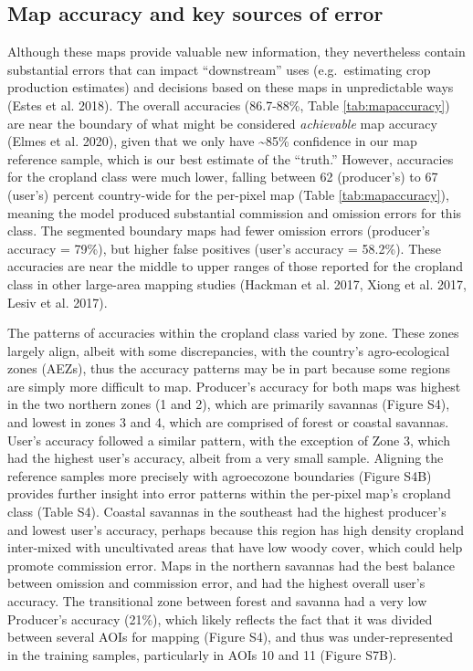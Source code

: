 \documentclass[11pt,a4paper]{article}
\begin{document}
\hypertarget{map-accuracy-and-key-sources-of-error}{%
\subsection{Map accuracy and key sources of
error}\label{map-accuracy-and-key-sources-of-error}}

Although these maps provide valuable new information, they nevertheless
contain substantial errors that can impact ``downstream'' uses
(e.g.~estimating crop production estimates) and decisions based on these
maps in unpredictable ways (Estes et al. 2018). The overall accuracies
(86.7-88\%, Table \ref{tab:mapaccuracy}) are near the boundary of what
might be considered \emph{achievable} map accuracy (Elmes et al. 2020),
given that we only have \textasciitilde85\% confidence in our map
reference sample, which is our best estimate of the ``truth.'' However,
accuracies for the cropland class were much lower, falling between 62
(producer's) to 67 (user's) percent country-wide for the per-pixel map
(Table \ref{tab:mapaccuracy}), meaning the model produced substantial
commission and omission errors for this class. The segmented boundary
maps had fewer omission errors (producer's accuracy = 79\%), but higher
false positives (user's accuracy = 58.2\%). These accuracies are near
the middle to upper ranges of those reported for the cropland class in
other large-area mapping studies (Hackman et al. 2017, Xiong et al.
2017, Lesiv et al. 2017).

The patterns of accuracies within the cropland class varied by zone.
These zones largely align, albeit with some discrepancies, with the
country's agro-ecological zones (AEZs), thus the accuracy patterns may
be in part because some regions are simply more difficult to map.
Producer's accuracy for both maps was highest in the two northern zones
(1 and 2), which are primarily savannas (Figure S4), and lowest in zones
3 and 4, which are comprised of forest or coastal savannas. User's
accuracy followed a similar pattern, with the exception of Zone 3, which
had the highest user's accuracy, albeit from a very small sample.
Aligning the reference samples more precisely with agroecozone
boundaries (Figure S4B) provides further insight into error patterns
within the per-pixel map's cropland class (Table S4). Coastal savannas
in the southeast had the highest producer's and lowest user's accuracy,
perhaps because this region has high density cropland inter-mixed with
uncultivated areas that have low woody cover, which could help promote
commission error. Maps in the northern savannas had the best balance
between omission and commission error, and had the highest overall
user's accuracy. The transitional zone between forest and savanna had a
very low Producer's accuracy (21\%), which likely reflects the fact that
it was divided between several AOIs for mapping (Figure S4), and thus
was under-represented in the training samples, particularly in AOIs 10
and 11 (Figure S7B).
\end{document}
